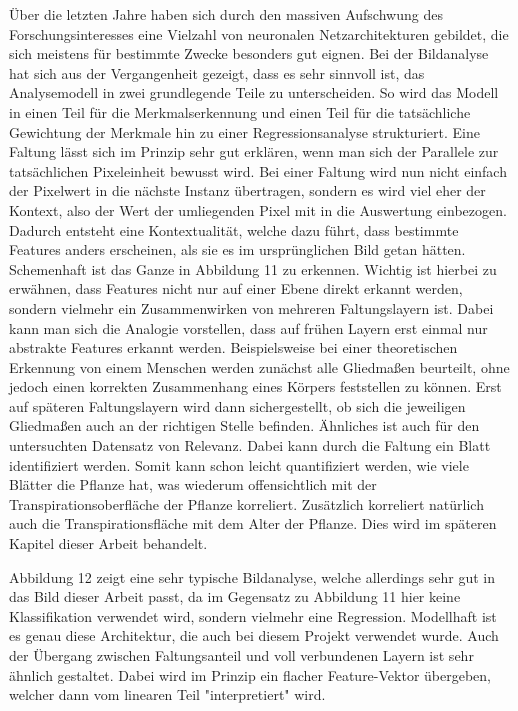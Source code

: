 Über die letzten Jahre haben sich durch den massiven Aufschwung des Forschungsinteresses eine Vielzahl von neuronalen Netzarchitekturen gebildet, die sich meistens für bestimmte Zwecke besonders gut eignen. Bei der Bildanalyse hat sich aus der Vergangenheit gezeigt, dass es sehr sinnvoll ist, das Analysemodell in zwei grundlegende Teile zu unterscheiden. So wird das Modell in einen Teil für die Merkmalserkennung und einen Teil für die tatsächliche Gewichtung der Merkmale hin zu einer Regressionsanalyse strukturiert. Eine Faltung lässt sich im Prinzip sehr gut erklären, wenn man sich der Parallele zur tatsächlichen Pixeleinheit bewusst wird. Bei einer Faltung wird nun nicht einfach der Pixelwert in die nächste Instanz übertragen, sondern es wird viel eher der Kontext, also der Wert der umliegenden Pixel mit in die Auswertung einbezogen. Dadurch entsteht eine Kontextualität, welche dazu führt, dass bestimmte Features anders erscheinen, als sie es im ursprünglichen Bild getan hätten. Schemenhaft ist das Ganze in Abbildung 11 zu erkennen. Wichtig ist hierbei zu erwähnen, dass Features nicht nur auf einer Ebene direkt erkannt werden, sondern vielmehr ein Zusammenwirken von mehreren Faltungslayern ist. \cite{ZOU2024107839} Dabei kann man sich die Analogie vorstellen, dass auf frühen Layern erst einmal nur abstrakte Features erkannt werden. Beispielsweise bei einer theoretischen Erkennung von einem Menschen werden zunächst alle Gliedmaßen beurteilt, ohne jedoch einen korrekten Zusammenhang eines Körpers feststellen zu können. Erst auf späteren Faltungslayern wird dann sichergestellt, ob sich die jeweiligen Gliedmaßen auch an der richtigen Stelle befinden. Ähnliches ist auch für den untersuchten Datensatz von Relevanz. Dabei kann durch die Faltung ein Blatt identifiziert werden. Somit kann schon leicht quantifiziert werden, wie viele Blätter die Pflanze hat, was wiederum offensichtlich mit der Transpirationsoberfläche der Pflanze korreliert. Zusätzlich korreliert natürlich auch die Transpirationsfläche mit dem Alter der Pflanze. Dies wird im späteren Kapitel dieser Arbeit behandelt. \newline \par
Abbildung 12 zeigt eine sehr typische Bildanalyse, welche allerdings sehr gut in das Bild dieser Arbeit passt, da im Gegensatz zu Abbildung 11 hier keine Klassifikation verwendet wird, sondern vielmehr eine Regression. Modellhaft ist es genau diese Architektur, die auch bei diesem Projekt verwendet wurde. Auch der Übergang zwischen Faltungsanteil und voll verbundenen Layern ist sehr ähnlich gestaltet. Dabei wird im Prinzip ein flacher Feature-Vektor übergeben, welcher dann vom linearen Teil "interpretiert" wird. \cite{Lai_2019}
